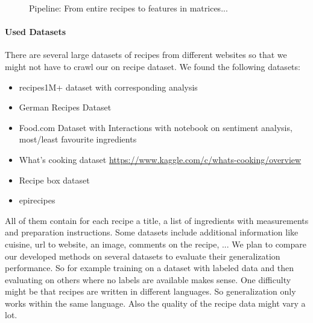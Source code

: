 \documentclass[
     12pt,         %
     a4paper,      %
     BCOR10mm,     %
     DIV14,        %
     ]{article}
\begin{document}

\begin{figure}[b!]
  \centering

  \caption{Pipeline: From entire recipes to features in matrices...}
  \label{fig:pipeline}
\end{figure}


\paragraph{Used Datasets} There are several large datasets of recipes from different websites so that we might not have to crawl our on recipe dataset. We found the following datasets:
\begin{itemize}
  \item recipes1M+ dataset \cite{marin2019recipe1m} with corresponding analysis \cite{8099810}
  \item German Recipes Dataset \cite{germanrecipesdataset}
  \item Food.com Dataset with Interactions \cite{foodcominteractions} with notebook on sentiment analysis, most/least favourite ingredients
  \item What's cooking dataset \url{https://www.kaggle.com/c/whats-cooking/overview}
  \item Recipe box dataset \cite{recipebox}
  \item epirecipes %
\end{itemize}
All of them contain for each recipe a title, a list of ingredients with measurements and preparation instructions. Some datasets include additional information like cuisine, url to website, an image, comments on the recipe, ...
We plan to compare our developed methods on several datasets to evaluate their generalization performance. So for example training on a dataset with labeled data and then evaluating on others where no labels are available makes sense. One difficulty might be that recipes are written in different languages. So generalization only works within the same language. Also the quality of the recipe data might vary a lot.
\end{document}
